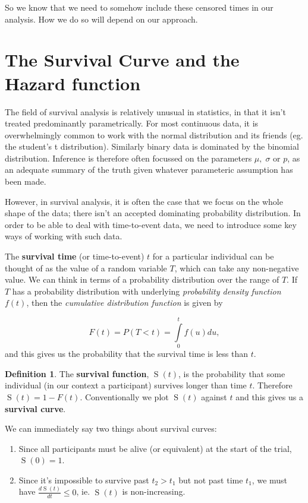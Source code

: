 \documentclass[
  openany]{book}
\providecommand{\tightlist}{%
  \setlength{\itemsep}{0pt}\setlength{\parskip}{0pt}}
\theoremstyle{definition}
\newtheorem{definition}{Definition}[chapter]
\theoremstyle{definition}
\theoremstyle{definition}
\theoremstyle{definition}
\theoremstyle{remark}
\begin{document}
So we know that we need to somehow include these censored times in our analysis. How we do so will depend on our approach.

\section{The Survival Curve and the Hazard function}\label{survhaz}

The field of survival analysis is relatively unusual in statistics, in that it isn't treated predominantly parametrically. For most continuous data, it is overwhelmingly common to work with the normal distribution and its friends (eg. the student's t distribution). Similarly binary data is dominated by the binomial distribution. Inference is therefore often focussed on the parameters \(\mu,\;\sigma\) or \(p\), as an adequate summary of the truth given whatever parameteric assumption has been made.

However, in survival analysis, it is often the case that we focus on the whole shape of the data; there isn't an accepted dominating probability distribution. In order to be able to deal with time-to-event data, we need to introduce some key ways of working with such data.

The \textbf{survival time} (or time-to-event) \(t\) for a particular individual can be thought of as the value of a random variable \(T\), which can take any non-negative value. We can think in terms of a probability distribution over the range of \(T\). If \(T\) has a probability distribution with underlying \emph{probability density function} \(f\left(t\right)\), then the \emph{cumulative distribution function} is given by

\[F\left(t\right) = P\left(T<t\right) = \int\limits_0^t f\left(u\right)du, \]
and this gives us the probability that the survival time is less than \(t\).

\begin{definition}
The \textbf{survival function}, \(\operatorname{S}\left(t\right)\), is the probability that some individual (in our context a participant) survives longer than time \(t\). Therefore \(\operatorname{S}\left(t\right) = 1 - F(t)\).
Conventionally we plot \(\operatorname{S}\left(t\right)\) against \(t\) and this gives us a \textbf{survival curve}.
\end{definition}

We can immediately say two things about survival curves:

\begin{enumerate}
\def\labelenumi{\arabic{enumi}.}
\tightlist
\item
  Since all participants must be alive (or equivalent) at the start of the trial, \(\operatorname{S}\left(0\right)=1\).
\item
  Since it's impossible to survive past \(t_2>t_1\) but not past time \(t_1\), we must have \(\frac{d\operatorname{S}\left(t\right)}{dt}\leq{0}\), ie. \(\operatorname{S}\left(t\right)\) is non-increasing.
\end{enumerate}
\end{document}
